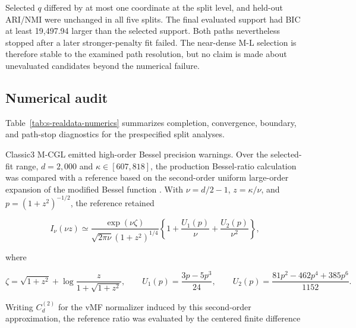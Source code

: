 \documentclass[preprint,12pt,authoryear]{elsarticle}
\begin{document}
Selected $q$ differed by at most one coordinate at the split level, and
held-out ARI/NMI were unchanged in all five splits. The final evaluated
support had BIC at least 19,497.94 larger than the selected support. Both
paths nevertheless stopped after a later stronger-penalty fit failed. The
near-dense M-L selection is therefore stable to the examined path resolution,
but no claim is made about unevaluated candidates beyond the numerical
failure.

\subsection{Numerical audit}

Table~\ref{tab:s-realdata-numerics} summarizes completion, convergence,
boundary, and path-stop diagnostics for the prespecified split analyses.

\begin{table}[H]
\centering
\small
\caption{Convergence and boundary diagnostics for the methods included in the
final prespecified split-performance tables.}
\label{tab:s-realdata-numerics}
\end{table}

Classic3 M-CGL emitted high-order Bessel precision warnings. Over the
selected-fit range, $d=2{,}000$ and $\kappa\in[607,818]$, the production
Bessel-ratio calculation was compared with a reference based on the
second-order uniform large-order expansion of the modified Bessel function
\citep[Sec.~10.41]{olver2010nist}. With $\nu=d/2-1$, $z=\kappa/\nu$, and
$p={(1+z^2)}^{-1/2}$, the reference retained

\[
I_\nu(\nu z)
\simeq
\frac{\exp(\nu\zeta)}{\sqrt{2\pi\nu}{(1+z^2)}^{1/4}}
\left\{1+\frac{U_1(p)}{\nu}+\frac{U_2(p)}{\nu^2}\right\},
\]

where

\[
\zeta=\sqrt{1+z^2}+\log\frac{z}{1+\sqrt{1+z^2}},\qquad
U_1(p)=\frac{3p-5p^3}{24},\qquad
U_2(p)=\frac{81p^2-462p^4+385p^6}{1152}.
\]

Writing $C_d^{(2)}$ for the vMF normalizer induced by this second-order
approximation, the reference ratio was evaluated by the centered finite
difference
\end{document}
